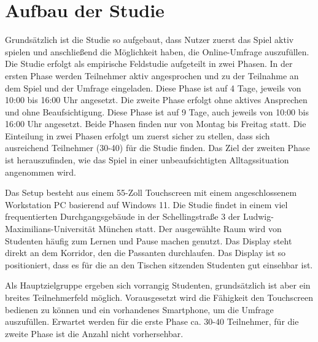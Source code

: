 \section{Aufbau der Studie}
Grundsätzlich ist die Studie so aufgebaut, dass Nutzer zuerst das Spiel aktiv spielen und anschließend die Möglichkeit haben, die Online-Umfrage auszufüllen.
Die Studie erfolgt als empirische Feldstudie aufgeteilt in zwei Phasen.
In der ersten Phase werden Teilnehmer aktiv angesprochen und zu der Teilnahme an dem Spiel und der Umfrage eingeladen. 
Diese Phase ist auf 4 Tage, jeweils von 10:00 bis 16:00 Uhr angesetzt. 
Die zweite Phase erfolgt ohne aktives Ansprechen und ohne Beaufsichtigung. Diese Phase ist auf 9 Tage, auch jeweils von 10:00 bis 16:00 Uhr angesetzt.
Beide Phasen finden nur von Montag bis Freitag statt.
Die Einteilung in zwei Phasen erfolgt um zuerst sicher zu stellen, dass sich ausreichend Teilnehmer (30-40) für die Studie finden. 
Das Ziel der zweiten Phase ist herauszufinden, wie das Spiel in einer unbeaufsichtigten Alltagssituation angenommen wird.

Das Setup besteht aus einem 55-Zoll Touchscreen mit einem angeschlossenem Workstation PC basierend auf Windows 11. 
Die Studie findet in einem viel frequentierten Durchgangsgebäude in der Schellingstraße 3 der Ludwig-Maximilians-Universität München statt.
Der ausgewählte Raum wird von Studenten häufig zum Lernen und Pause machen genutzt. 
Das Display steht direkt an dem Korridor, den die Passanten durchlaufen. Das Display ist so positioniert, dass es für die an den Tischen sitzenden Studenten gut einsehbar ist. 

Als Hauptzielgruppe ergeben sich vorrangig Studenten, grundsätzlich ist aber ein breites Teilnehmerfeld möglich. 
Vorausgesetzt wird die Fähigkeit den Touchscreen bedienen zu können und ein vorhandenes Smartphone, um die Umfrage auszufüllen. 
Erwartet werden für die erste Phase ca. 30-40 Teilnehmer, für die zweite Phase ist die Anzahl nicht vorhersehbar.

